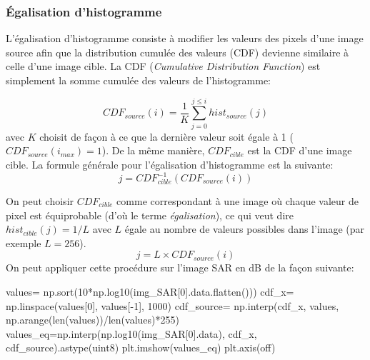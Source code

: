 \documentclass[
  11pt,
  letterpaper,
  open=any,
  twoside=false,
  french]{scrbook}
\newenvironment{Shaded}{\begin{snugshade}}{\end{snugshade}}
\newcommand{\BuiltInTok}[1]{\textcolor[rgb]{0.00,0.23,0.31}{#1}}
\newcommand{\DecValTok}[1]{\textcolor[rgb]{0.68,0.00,0.00}{#1}}
\newcommand{\NormalTok}[1]{\textcolor[rgb]{0.00,0.23,0.31}{#1}}
\newcommand{\OperatorTok}[1]{\textcolor[rgb]{0.37,0.37,0.37}{#1}}
\newcommand{\StringTok}[1]{\textcolor[rgb]{0.13,0.47,0.30}{#1}}
\begin{document}
\subsubsection{Égalisation
d'histogramme}\label{uxe9galisation-dhistogramme}

L'égalisation d'histogramme consiste à modifier les valeurs des pixels
d'une image source afin que la distribution cumulée des valeurs (CDF)
devienne similaire à celle d'une image cible. La CDF (\emph{Cumulative
Distribution Function}) est simplement la somme cumulée des valeurs de
l'histogramme:

\[
CDF_{source}(i)= \frac{1}{K}\sum_{j=0}^{j \leq i} hist_{source}(j)
\] avec \(K\) choisit de façon à ce que la dernière valeur soit égale à
1 (\(CDF_{source}(i_{max})=1\)). De la même manière, \(CDF_{cible}\) est
la CDF d'une image cible. La formule générale pour l'égalisation
d'histogramme est la suivante: \[
j = CDF_{cible}^{-1}(CDF_{source}(i))
\]

On peut choisir \(CDF_{cible}\) comme correspondant à une image où
chaque valeur de pixel est équiprobable (d'où le terme
\emph{égalisation}), ce qui veut dire \(hist_{cible}(j)=1/L\) avec \(L\)
égale au nombre de valeurs possibles dans l'image (par exemple
\(L=256\)). \[
j = L \times CDF_{source}(i)
\] On peut appliquer cette procédure sur l'image SAR en dB de la façon
suivante:

\begin{Shaded}
\begin{Highlighting}[]
\NormalTok{values}\OperatorTok{=}\NormalTok{ np.sort(}\DecValTok{10}\OperatorTok{*}\NormalTok{np.log10(img\_SAR[}\DecValTok{0}\NormalTok{].data.flatten()))}
\NormalTok{cdf\_x}\OperatorTok{=}\NormalTok{ np.linspace(values[}\DecValTok{0}\NormalTok{], values[}\OperatorTok{{-}}\DecValTok{1}\NormalTok{], }\DecValTok{1000}\NormalTok{)}
\NormalTok{cdf\_source}\OperatorTok{=}\NormalTok{ np.interp(cdf\_x, values, np.arange(}\BuiltInTok{len}\NormalTok{(values))}\OperatorTok{/}\BuiltInTok{len}\NormalTok{(values)}\OperatorTok{*}\DecValTok{255}\NormalTok{)}
\NormalTok{values\_eq}\OperatorTok{=}\NormalTok{np.interp(np.log10(img\_SAR[}\DecValTok{0}\NormalTok{].data), cdf\_x, cdf\_source).astype(}\StringTok{\textquotesingle{}uint8\textquotesingle{}}\NormalTok{)}
\NormalTok{plt.imshow(values\_eq)}
\NormalTok{plt.axis(}\StringTok{\textquotesingle{}off\textquotesingle{}}\NormalTok{)}
\end{Highlighting}
\end{Shaded}
\end{document}
